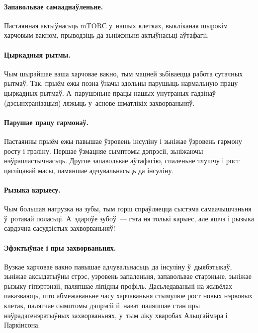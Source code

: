 \paragraph{Запавольвае самааднаўленьне.}\!
Пастаянная актыўнасьць mTORС у~нашых клетках, выкліканая шырокім харчовым вакном, прыводзіць да зьніжэньня актыўнасьці аўтафагіі.

\paragraph{Цыркадныя рытмы.}
Чым шырэйшае ваша харчовае вакно, тым мацней зьбіваецца работа сутачных рытмаў. Так, прыём ежы позна ўначы здольны парушыць нармальную працу цыркадных рытмаў. А~парушэньне працы нашых унутраных гадзінаў (дэсынхранізацыя) ляжыць у~аснове шматлікіх захворваньняў.

\paragraph{Парушае працу гармонаў.}
Пастаянны прыём ежы павышае ўзровень інсуліну і зьніжае ўзровень гармону росту і грэліну. Першае ўзмацняе сымптомы дэпрэсіі, зьніжаючы нэўрапластычнасьць. Другое запавольвае аўтафагію, спаленьне тлушчу і рост цягліцавай масы, памяншае адчувальнасьць да інсуліну.

\paragraph{Рызыка карыесу.}
Чым большая нагрузка на зубы, тым горш спраўляецца сыстэма самаачышчэньня ў~ротавай поласьці. А~здароўе зубоў~--- гэта ня толькі карыес, але яшчэ і рызыка сардэчна-сасудзістых захворваньняў!

\paragraph{Эфэктыўнае і пры захворваньнях.}
Вузкае харчовае вакно павышае адчувальнасьць да інсуліну ў~дыябэтыкаў, зьніжае аксыдатыўны стрэс, узровень запаленьня, запавольвае старэньне, зьніжае рызыку гіпэртэнзіі, паляпшае ліпідны профіль. Дасьледаваньні на жывёлах паказваюць, што абмежаваньне часу харчаваньня стымулюе рост новых нэрвовых клетак, палягчае сымптомы дэпрэсіі й~нават паляпшае стан пры нэўрадэгенэратыўных захворваньнях, у~тым ліку хваробах Альцгаймэра і Паркінсона.

